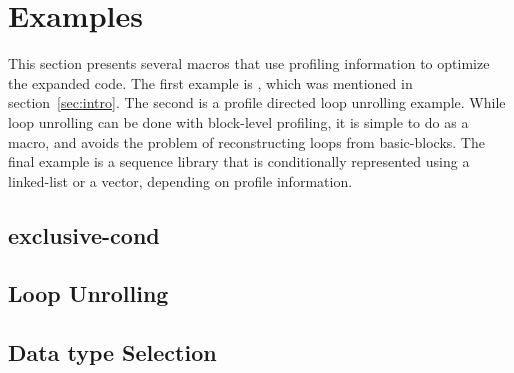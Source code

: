\section{Examples}
\label{sec:examples}
This section presents several macros that use profiling information to
optimize the expanded code. The first example is
, which was mentioned in
section~\ref{sec:intro}. The second is a profile directed loop unrolling
example. While loop unrolling can be done with block-level profiling, it
is simple to do as a macro, and avoids the problem of reconstructing
loops from basic-blocks. The final example is a sequence library that is
conditionally represented using a linked-list or a vector, depending on
profile information.

\subsection{exclusive-cond}
\subsection{Loop Unrolling}
\subsection{Data type Selection}
